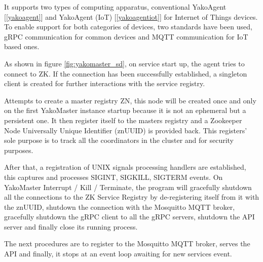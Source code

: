         It supports two types of computing apparatus, conventional YakoAgent [\ref{yakoagent}] and YakoAgent (IoT) [\ref{yakoagentiot}] for Internet of Things devices. To enable support for both categories of devices, two standards have been used, gRPC communication for common devices and MQTT communication for IoT based ones.
        
            As shown in figure \ref{fig:yakomaster_sd}, on service start up, the agent tries to connect to ZK. If the connection has been successfully established, a singleton client is created for further interactions with the service registry.
            
            Attempts to create a master registry ZN, this node will be created once and only on the first YakoMaster instance startup because it is not an ephemeral but a persistent one. It then register itself to the masters registry and a Zookeeper Node Universally Unique Identifier (znUUID) is provided back. This registers' sole purpose is to track all the coordinators in the cluster and for security purposes.
            
            After that, a registration of UNIX signals processing handlers are established, this captures and processes SIGINT, SIGKILL, SIGTERM events. On YakoMaster Interrupt / Kill / Terminate, the program will gracefully shutdown all the connections to the ZK Service Registry by de-registering itself from it with the znUUID, shutdown the connection with the Mosquitto MQTT broker, gracefully shutdown the gRPC client to all the gRPC servers, shutdown the API server and finally close its running process.
            
            The next procedures are to register to the Mosquitto MQTT broker, serves the API and finally, it stops at an event loop awaiting for new services event. 
            
